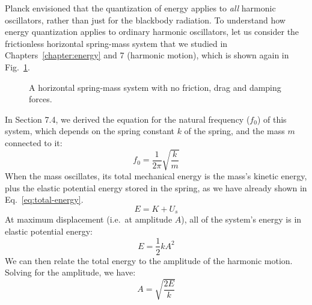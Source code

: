 Planck envisioned that the quantization of energy applies to \emph{all} harmonic
oscillators, rather than just for the blackbody radiation. To understand how
energy quantization applies to ordinary harmonic oscillators, let us
consider the frictionless horizontal spring-mass system that we studied in
Chapters~\ref{chapter:energy} and 7 (harmonic motion), which is shown again in
Fig.~\ref{fig:horizontal-spring-mass1-again}.
\begin{figure}[hbt]
  \centering
  \caption{A horizontal spring-mass system with no friction, drag and damping
    forces.}
  \label{fig:horizontal-spring-mass1-again}
\end{figure}
In Section 7.4, we derived the equation for the natural frequency ($f_0$) of
this system, which depends on the spring constant $k$ of the spring, and the
mass $m$ connected to it:
\begin{equation*}
  f_0 = \frac1{2\pi}\sqrt{\frac km}
\end{equation*}
When the mass oscillates, its total mechanical energy is the mass's kinetic
energy, plus the elastic potential energy stored in the spring, as we have
already shown in Eq.~\ref{eq:total-energy}.
\begin{equation*}
  E = K + U_s
  \label{eq:total-energy}
\end{equation*}
At maximum displacement (i.e.\ at amplitude $A$), all of the system's energy is
in elastic potential energy:
\begin{equation*}
  E = \frac12kA^2
\end{equation*}
We can then relate the total energy to the amplitude of the harmonic motion.
Solving for the amplitude, we have:
\begin{equation}
  A=\sqrt{\frac{2E}k}
  \label{eq:amplitude-from-energy}
\end{equation}

